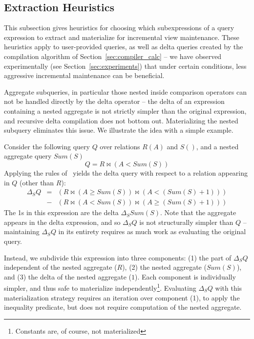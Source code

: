 \subsection{Extraction Heuristics}
\label{sec:advanced-rewriting}

This subsection gives heuristics for choosing which subexpressions of
a query expression to extract and materialize for incremental view maintenance.  These heuristics apply to user-provided queries, as well as delta queries created by the compilation algorithm of Section~\ref{sec:compiler_calc} -- we have observed experimentally (see Section~\ref{sec:experiments}) that under certain conditions, less aggressive incremental maintenance can be beneficial.

Aggregate subqueries, in particular those nested inside comparison operators can not be handled directly by the delta operator -- the delta of an expression containing a nested aggregate is not strictly simpler than the original expression, and recursive delta compilation does not bottom out.  Materializing the nested subquery eliminates this issue.  We illustrate the idea with a simple example.

\begin{example}
Consider the following query $Q$ over relations $R(A)$ and $S()$, and a nested aggregate query $Sum(S)$
{\small $$Q = R \bowtie (A < Sum(S))$$}
Applying the rules of~\cite{koch-pods:10} yields the delta query with respect to a relation appearing in $Q$ (other than $R$):
{\small \begin{eqnarray*}
\Delta_SQ & =  & (R \bowtie (A \geq Sum(S)) \bowtie (A < (Sum(S) +1)))\\
&-& (R \bowtie (A <  Sum(S)) \bowtie (A \geq (Sum(S) + 1)))
\end{eqnarray*}}
The 1s in this expression are the delta $\Delta_S Sum(S)$.  Note that the aggregate appears in the delta expression, and so $\Delta_SQ$ is not structurally simpler than $Q$ -- maintaining $\Delta_S Q$ in its entirety requires as much work as evaluating the original query.  

Instead, we subdivide this expression into three components: (1) the part of $\Delta_S Q$ independent of the nested aggregate ($R$), (2) the nested aggregate ($Sum(S)$), and (3) the delta of the nested aggregate ($1$).  Each component is individually simpler, and thus safe to materialize independently\footnote{Constants are, of course, not materialized}.  Evaluating $\Delta_S Q$ with this materialization strategy requires an iteration over component (1), to apply the inequality predicate, but does not require computation of the nested aggregate.
\end{example}

